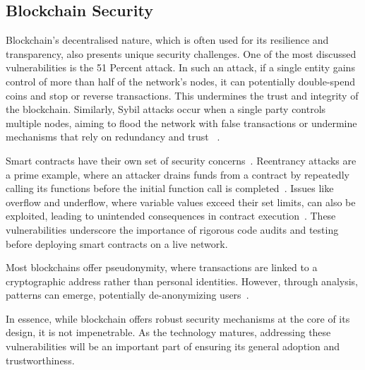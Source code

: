 \subsection{Blockchain Security}
Blockchain's decentralised nature, which is often used for its resilience and transparency, also presents unique security challenges. One of the most discussed vulnerabilities is the 51 Percent attack. In such an attack, if a single entity gains control of more than half of the network's nodes, it can potentially double-spend coins and stop or reverse transactions. This undermines the trust and integrity of the blockchain. Similarly, Sybil attacks occur when a single party controls multiple nodes, aiming to flood the network with false transactions or undermine mechanisms that rely on redundancy and trust ~\cite{Singh.2021}.

Smart contracts have their own set of security concerns~\cite{Alkhalifah.2021}. Reentrancy attacks are a prime example, where an attacker drains funds from a contract by repeatedly calling its functions before the initial function call is completed~\cite{Alkhalifah.2021}. Issues like overflow and underflow, where variable values exceed their set limits, can also be exploited, leading to unintended consequences in contract execution~\cite{Guo.2022}. These vulnerabilities underscore the importance of rigorous code audits and testing before deploying smart contracts on a live network.

Most blockchains offer pseudonymity, where transactions are linked to a cryptographic address rather than personal identities. However, through analysis, patterns can emerge, potentially de-anonymizing users~\cite{Kus.2022}.

In essence, while blockchain offers robust security mechanisms at the core of its design, it is not impenetrable. As the technology matures, addressing these vulnerabilities will be an important part of ensuring its general adoption and trustworthiness.
